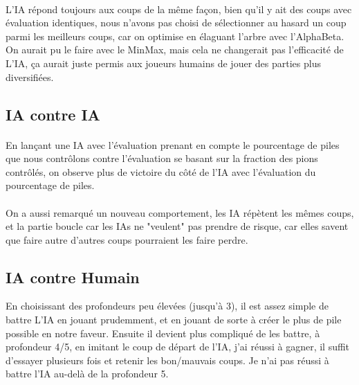 \documentclass[article, backcover, french, nodocumentinfo]{upmethodology-document}
\begin{document}
			\paragraph{}
				L'IA répond toujours aux coups de la même façon, bien qu'il y ait des coups avec évaluation identiques, nous n'avons pas choisi de sélectionner au hasard un coup parmi les meilleurs coups, car on optimise en élaguant l'arbre avec l'AlphaBeta. On aurait pu le faire avec le MinMax, mais cela ne changerait pas l'efficacité de L'IA, ça aurait juste permis aux joueurs humains de jouer des parties plus diversifiées.
		\subsection{IA contre IA}
			\paragraph{}
				En lançant une IA avec l'évaluation prenant en compte le pourcentage de piles que nous contrôlons contre l'évaluation se basant sur la fraction des pions contrôlés, on observe plus de victoire du côté de l'IA avec l'évaluation du pourcentage de piles.
			\paragraph{}
				On a aussi remarqué un nouveau comportement, les IA répètent les mêmes coups, et la partie boucle car les IAs ne "veulent" pas prendre de risque, car elles savent que faire autre d'autres coups pourraient les faire perdre.
		\subsection{IA contre Humain}
				En choisissant des profondeurs peu élevées (jusqu'à 3), il est assez simple de battre L'IA en jouant prudemment, et en jouant de sorte à créer le plus de pile possible en notre faveur. Ensuite il devient plus compliqué de les battre, à profondeur 4/5, en imitant le coup de départ de l'IA, j'ai réussi à gagner, il suffit d'essayer plusieurs fois et retenir les bon/mauvais coups. Je n'ai pas réussi à battre l'IA au-delà de la profondeur 5.
\end{document}
